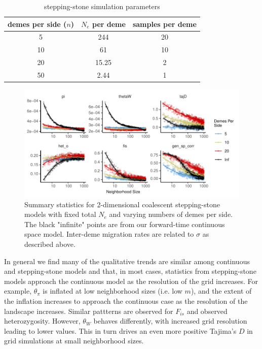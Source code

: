 \documentclass[10pt,twoside,lineno,hidelinks]{preprint}
\begin{document}
\begin{table}[h]
\centering
\begin{tabular}{ccc}
     demes per side ($n$)&$N_e$ per deme  & samples per deme  \\
     \hline
     5 & 244 & 20 \\
     10 & 61 & 10 \\
     20 & 15.25 & 2 \\
     50 & 2.44 & 1 \\
\end{tabular}
\captionsetup{justification=centering}
\caption{stepping-stone simulation parameters}
\label{table:grid_params}
\end{table}


\begin{figure}[h]
\centering
\includegraphics[width=\textwidth]{ms/figures/grid_ss_curves.pdf}
\caption{Summary statistics for 2-dimensional coalescent stepping-stone models with fixed total $N_{e}$ and varying numbers of demes per side. The black "infinite" points are from our forward-time continuous space model. Inter-deme migration rates are related to $\sigma$ as described above.}
\label{fig:grid_stats}
\end{figure}

In general we find many of the qualitative trends are similar among continuous and stepping-stone models and that, in most cases, statistics from stepping-stone models approach the continuous model as the resolution of the grid increases. For example, $\theta_\pi$ is inflated at low neighborhood sizes (i.e. low $m$), and the extent of the inflation increases to approach the continuous case as the resolution of the landscape increases. Similar pattterns are observed for $F_{is}$ and observed heterozygosity. However, $\theta_{W}$ behaves differently, with increased grid resolution leading to lower values. This in turn drives an even more positive Tajima's $D$ in grid simulations at small neighborhood sizes.
\end{document}

